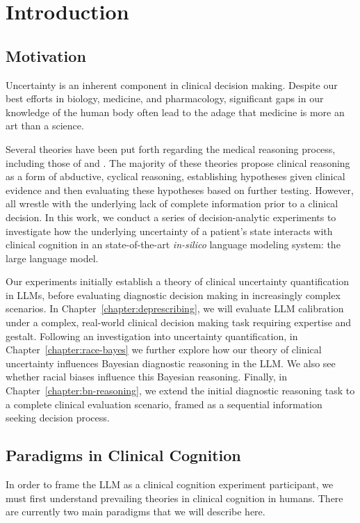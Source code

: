 \chapter{Introduction} \label{chapter:intro}

\section{Motivation}\label{section:motivation}
Uncertainty is an inherent component in clinical decision making. Despite our best efforts in biology, medicine, and pharmacology, significant gaps in our knowledge of the human body often lead to the adage that medicine is more an art than a science. 

Several theories have been put forth regarding the medical reasoning process, including those of \citet{blois1984information} and \citet{paukerThresholdApproachClinical1980}. The majority of these theories propose clinical reasoning as a form of abductive, cyclical reasoning, establishing hypotheses given clinical evidence and then evaluating these hypotheses based on further testing. However, all wrestle with the underlying lack of complete information prior to a clinical decision. In this work, we conduct a series of decision-analytic experiments to investigate how the underlying uncertainty of a patient's state interacts with clinical cognition in an state-of-the-art \textit{in-silico} language modeling system: the large language model. 

Our experiments initially establish a theory of clinical uncertainty quantification in LLMs, before evaluating diagnostic decision making in increasingly complex scenarios. In Chapter~\ref{chapter:deprescribing}, we will evaluate LLM calibration under a complex, real-world clinical decision making task requiring expertise and gestalt. Following an investigation into uncertainty quantification, in Chapter~\ref{chapter:race-bayes} we further explore how our theory of clinical uncertainty influences Bayesian diagnostic reasoning in the LLM. We also see whether racial biases influence this Bayesian reasoning. Finally, in Chapter~\ref{chapter:bn-reasoning}, we extend the initial diagnostic reasoning task to a complete clinical evaluation scenario, framed as a sequential information seeking decision process.

\section{Paradigms in Clinical Cognition}
\label{subchapter:paradigms-clinical-cognition}
In order to frame the LLM as a clinical cognition experiment participant, we must first understand prevailing theories in clinical cognition in humans. There are currently two main paradigms that we will describe here. 

